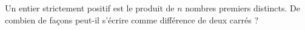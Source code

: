 Un entier strictement positif est le produit de $n$ nombres premiers distincts. De combien de façons peut-il s'écrire comme différence de deux carrés ?
